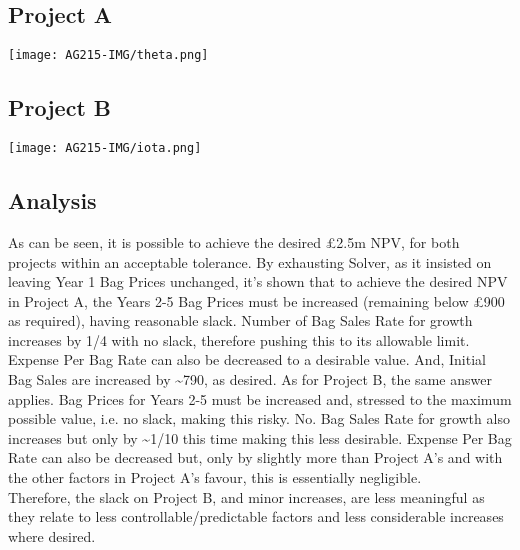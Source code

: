 \documentclass[11pt, english]{article}
\begin{document}
	\subsection{Project A}

	\begin{center}
		\texttt{[image: AG215-IMG/theta.png]}
        \end{center}

	\subsection{Project B}

	\begin{center}
                \texttt{[image: AG215-IMG/iota.png]}
        \end{center}	

	\subsection{Analysis}

	As can be seen, it is possible to achieve the desired \pounds2.5m NPV, for both projects within an acceptable tolerance. By exhausting Solver, as it insisted on leaving Year 1 Bag Prices unchanged, it's shown that to achieve the desired NPV in Project A, the Years 2-5 Bag Prices must be increased (remaining below \pounds900 as required), having reasonable slack. Number of Bag Sales Rate for growth increases by 1/4 with no slack, therefore pushing this to its allowable limit. Expense Per Bag Rate can also be decreased to a desirable value. And, Initial Bag Sales are increased by \~{}790, as desired. As for Project B, the same answer applies. Bag Prices for Years 2-5 must be increased and, stressed to the maximum possible value, i.e. no slack, making this risky. No. Bag Sales Rate for growth also increases but only by \~{}1/10 this time making this less desirable. Expense Per Bag Rate can also be decreased but, only by slightly more than Project A's and with the other factors in Project A's favour, this is essentially negligible.\\

	Therefore, the slack on Project B, and minor increases, are less meaningful as they relate to less controllable/predictable factors and less considerable increases where desired.
\end{document}
